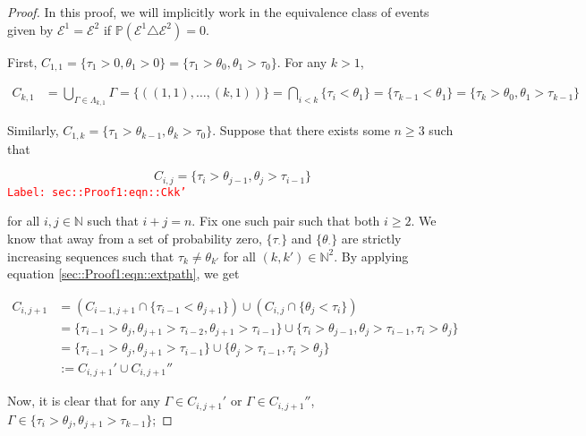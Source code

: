 \documentclass[12pt]{article}
\newcommand{\mb}{\mathbb}
\newcommand{\mc}{\mathcal}
\newcommand{\tr}{\textcolor{red}}
\newcommand{\labe}[1]{\tr{\texttt{Label: #1}}}
\newcommand{\ind}{\hspace{24pt}}
\newcommand{\pr}{\mb{P}}							%
\newcommand{\indx}[1]{_{#1}}					%
\newcommand{\rt}{\tau}							%
\newcommand{\rtt}{\theta}						%
\renewcommand{\it}{k}							%
\newcommand{\apath}{\Gamma}						%
\newcommand{\pathset}[2]{\Lambda_{#1,#2}}		%
\newcommand{\pathsete}[2]{C_{#1,#2}}			%
\newcommand{\evnt}{\mc{E}}						%
\begin{document}
\begin{proof}
In this proof, we will implicitly work in the equivalence class of events given by \(\evnt^1 = \evnt^2\) if \(\pr(\evnt^1 \triangle \evnt^2) = 0\).  

\ind First, \(\pathsete{1}{1} = \{\rt\indx{1} > 0,\rtt\indx{1} > 0\} = \{\rt\indx{1} > \rtt\indx{0},\rtt\indx{1}>\rt\indx{0}\}\). For any \(\it > 1\),

\begin{align*}
\pathsete{\it}{1} &= \bigcup_{\apath \in \pathset{\it}{1}} \apath = \{((1,1),\dots,(\it,1))\} = \bigcap_{i < \it} \{\rt\indx{i} < \rtt\indx{1}\} = \{\rt\indx{\it-1} < \rtt\indx{1}\} = \{\rt\indx{\it} > \rtt\indx{0},\rtt\indx{1} > \rt\indx{\it-1}\}
\end{align*}

Similarly, \(\pathsete{1}{\it} = \{\rt\indx{1} > \rtt\indx{\it-1}, \rtt\indx{\it} > \rt\indx{0}\}\). Suppose that there exists some \(n\geq 3\) such that

\begin{equation}
\pathsete{i}{j} = \{\rt\indx{i} > \rtt\indx{j-1},\rtt\indx{j} > \rt\indx{i-1}\}
\label{sec::Proof1:eqn::Ckk'}
\end{equation}
\labe{sec::Proof1:eqn::Ckk'}

for all \(i, j\in \mb{N}\) such that \(i+j = n\). Fix one such pair such that both \(i \geq 2\). We know that away from a set of probability zero, \(\{\rt\indx{\cdot}\}\) and \(\{\rtt\indx{\cdot}\}\) are strictly increasing sequences such that \(\rt\indx{\it} \neq \rtt\indx{\it'}\) for all \((\it,\it')\in \mb{N}^2\). By applying equation \eqref{sec::Proof1:eqn::extpath}, we get

\begin{align*}
\pathsete{i}{j+1} &= \left(\pathsete{i-1}{j+1} \cap \{\rt\indx{i - 1} < \rtt\indx{j+1}\}\right) \cup \left(\pathsete{i}{j}\cap \{\rtt\indx{j} < \rt\indx{i}\}\right)\\
&= \{\rt\indx{i - 1} > \rtt\indx{j}, \rtt\indx{j+1} > \rt\indx{i - 2},  \rtt\indx{j+1} > \rt\indx{i -1}\}\cup\{\rt\indx{i} > \rtt\indx{j-1}, \rtt\indx{j} > \rt\indx{i - 1},\rt\indx{i} > \rtt\indx{j}\}\\
&= \{\rt\indx{i - 1} > \rtt\indx{j}, \rtt\indx{j+1} > \rt\indx{i - 1}\}\cup\{\rtt\indx{j} > \rt\indx{i - 1},\rt\indx{i} > \rtt\indx{j}\}\\
&:= \pathsete{i}{j+1}' \cup\pathsete{i}{j+1}''
\end{align*}

Now, it is clear that for any \(\apath \in \pathsete{i}{j+1}'\) or \(\apath \in \pathsete{i}{j+1}''\), \(\apath\in \{\rt\indx{i} > \rtt\indx{j},\rtt\indx{j+1} > \rt\indx{\it-1}\}\);


\end{proof}
\end{document}
